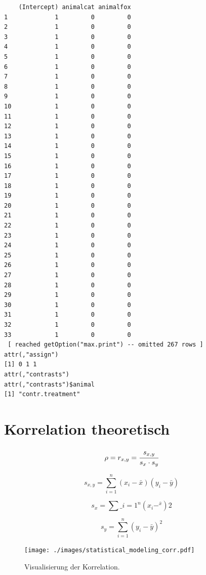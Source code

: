 \documentclass[
  letterpaper,
  DIV=11,
  oneside]{scrreport}
\begin{document}
\begin{verbatim}
    (Intercept) animalcat animalfox
1             1         0         0
2             1         0         0
3             1         0         0
4             1         0         0
5             1         0         0
6             1         0         0
7             1         0         0
8             1         0         0
9             1         0         0
10            1         0         0
11            1         0         0
12            1         0         0
13            1         0         0
14            1         0         0
15            1         0         0
16            1         0         0
17            1         0         0
18            1         0         0
19            1         0         0
20            1         0         0
21            1         0         0
22            1         0         0
23            1         0         0
24            1         0         0
25            1         0         0
26            1         0         0
27            1         0         0
28            1         0         0
29            1         0         0
30            1         0         0
31            1         0         0
32            1         0         0
33            1         0         0
 [ reached getOption("max.print") -- omitted 267 rows ]
attr(,"assign")
[1] 0 1 1
attr(,"contrasts")
attr(,"contrasts")$animal
[1] "contr.treatment"
\end{verbatim}

\hypertarget{korrelation-theoretisch}{%
\section*{Korrelation theoretisch}\label{korrelation-theoretisch}}

\[
\rho = r_{x,y} = \cfrac{s_{x,y}}{s_x \cdot s_y}
\]

\[
s_{x,y} = \sum_{i=1}^n(x_i-\bar{x})(y_i-\bar{y})
\]

\[
s_x = \sum\_{i=1}^n(x_i-^\bar{x})2
\]

\[
s_y = \sum_{i=1}^n(y_i-\bar{y})^2
\]

\begin{figure}

{\centering \texttt{[image: ./images/statistical\_modeling\_corr.pdf]}

}

\caption{\label{fig-corr1}Visualisierung der Korrelation.}

\end{figure}
\end{document}
